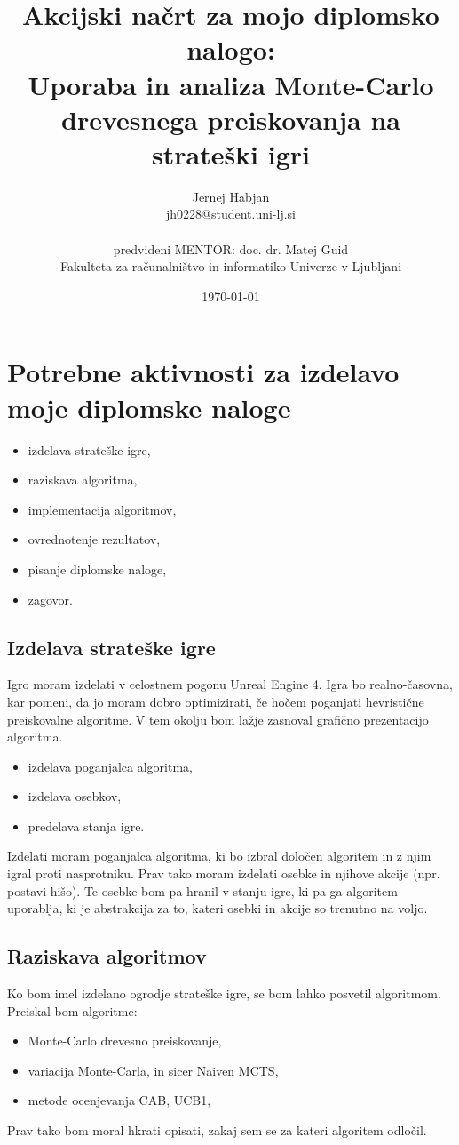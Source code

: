 \documentclass[11pt,a4paper]{article}
\title{Akcijski načrt za mojo diplomsko nalogo:\\
Uporaba in analiza Monte-Carlo drevesnega preiskovanja na strateški igri}
\author{Jernej Habjan\\
jh0228@student.uni-lj.si\\
\ \\
predvideni MENTOR: doc. dr. Matej Guid \\
Fakulteta za računalništvo in informatiko Univerze v Ljubljani
\date{\today}         
}
\begin{document}
\maketitle

\section{Potrebne aktivnosti za izdelavo moje diplomske naloge}
\begin{itemize}
\item izdelava strateške igre,
\item raziskava algoritma,
\item implementacija algoritmov,
\item ovrednotenje rezultatov,
\item pisanje diplomske naloge,
\item zagovor.
\end{itemize}

\subsection{Izdelava strateške igre}
Igro moram izdelati v celostnem pogonu Unreal Engine 4.
Igra bo realno-časovna, kar pomeni, da jo moram dobro optimizirati, če hočem poganjati hevristične preiskovalne algoritme. V tem okolju bom lažje zasnoval grafično prezentacijo algoritma.
\begin{itemize}
	\item izdelava poganjalca algoritma,
	\item izdelava osebkov,
	\item predelava stanja igre.
\end{itemize}
Izdelati moram poganjalca algoritma, ki bo izbral določen algoritem in z njim igral proti nasprotniku.
Prav tako moram izdelati osebke in njihove akcije (npr. postavi hišo).
Te osebke bom pa hranil v stanju igre, ki pa ga algoritem uporablja, ki je abstrakcija za to, kateri osebki in akcije so trenutno na voljo.


\subsection{Raziskava algoritmov}
Ko bom imel izdelano ogrodje strateške igre, se bom lahko posvetil algoritmom.
Preiskal bom algoritme:
\begin{itemize}
\item Monte-Carlo drevesno preiskovanje,
\item variacija Monte-Carla, in sicer Naiven MCTS,
\item metode ocenjevanja CAB, UCB1,
\end{itemize}
Prav tako bom moral hkrati opisati, zakaj sem se za kateri algoritem odločil.
\end{document}
